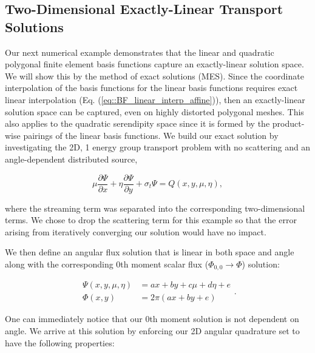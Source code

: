 \subsection{Two-Dimensional Exactly-Linear Transport Solutions}
\label{sec::BF_Results_Linear}

Our next numerical example demonstrates that the linear and quadratic polygonal finite element basis functions capture an exactly-linear solution space. We will show this by the method of exact solutions (MES). Since the coordinate interpolation of the basis functions for the linear basis functions requires exact linear interpolation (Eq. (\ref{eq::BF_linear_interp_affine})), then an exactly-linear solution space can be captured, even on highly distorted polygonal meshes. This also applies to the quadratic serendipity space since it is formed by the product-wise pairings of the linear basis functions. We build our exact solution by investigating the 2D, 1 energy group transport problem with no scattering and an angle-dependent distributed source,

\begin{equation}
\label{eq::BF_Results_Linear_angflux}
\mu \frac{\partial \Psi}{\partial x} + \eta \frac{\partial \Psi}{\partial y} + \sigma_t \Psi = Q(x,y, \mu, \eta), 
\end{equation}

\noindent where the streaming term was separated into the corresponding two-dimensional terms. We chose to drop the scattering term for this example so that the error arising from iteratively converging our solution would have no impact.

We then define an angular flux solution that is linear in both space and angle along with the corresponding 0th moment scalar flux ($\Phi_{0,0} \rightarrow \Phi$) solution:

\begin{equation}
\label{eq::BF_Results_Linear_fluxsols}
\begin{aligned}
\Psi (x,y,\mu,\eta) &= ax + by + c \mu + d\eta + e\\
\Phi (x,y) &= 2 \pi \left( ax + by  + e \right)
\end{aligned} .
\end{equation}

\noindent One can immediately notice that our 0th moment solution is not dependent on angle. We arrive at this solution by enforcing our 2D angular quadrature set to have the following properties:

